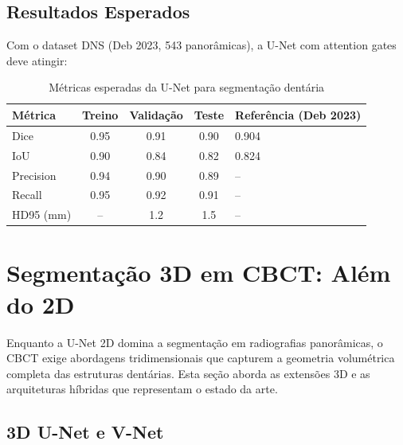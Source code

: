\subsection{Resultados Esperados}

Com o dataset DNS (Deb 2023, 543 panorâmicas), a U-Net com attention gates
deve atingir:

\begin{table}[H]
  \centering
  \caption{Métricas esperadas da U-Net para segmentação dentária}
  \label{tab:unet-results}
  \begin{tabularx}{\textwidth}{lcccX}
    \toprule
    \textbf{Métrica} & \textbf{Treino} & \textbf{Validação} & \textbf{Teste} & \textbf{Referência (Deb 2023)} \\
    \midrule
    Dice & 0.95 & 0.91 & 0.90 & 0.904 \\
    IoU & 0.90 & 0.84 & 0.82 & 0.824 \\
    Precision & 0.94 & 0.90 & 0.89 & -- \\
    Recall & 0.95 & 0.92 & 0.91 & -- \\
    HD95 (mm) & -- & 1.2 & 1.5 & -- \\
    \bottomrule
  \end{tabularx}
\end{table}


\section{Segmentação 3D em CBCT: Além do 2D}
\label{sec:segmentacao-3d}

Enquanto a U-Net 2D domina a segmentação em radiografias panorâmicas, o CBCT
exige abordagens tridimensionais que capturem a geometria volumétrica completa
das estruturas dentárias. Esta seção aborda as extensões 3D e as arquiteturas
híbridas que representam o estado da arte.

\subsection{3D U-Net e V-Net}


